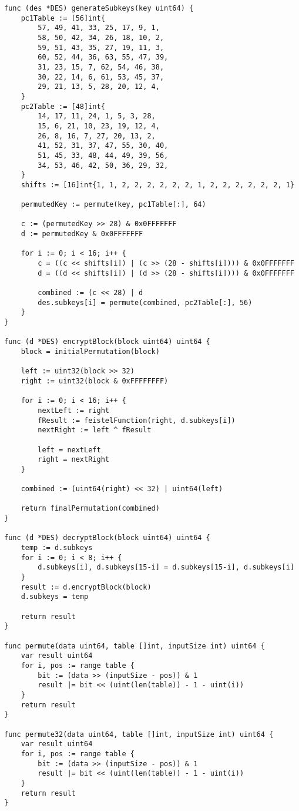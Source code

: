 \begin{lstlisting}[style=golang, caption={Реализация алгоритма шифрования и расшифровки с открытым ключом файла}, label=lst:codegolang]
func (des *DES) generateSubkeys(key uint64) {
	pc1Table := [56]int{
		57, 49, 41, 33, 25, 17, 9, 1,
		58, 50, 42, 34, 26, 18, 10, 2,
		59, 51, 43, 35, 27, 19, 11, 3,
		60, 52, 44, 36, 63, 55, 47, 39,
		31, 23, 15, 7, 62, 54, 46, 38,
		30, 22, 14, 6, 61, 53, 45, 37,
		29, 21, 13, 5, 28, 20, 12, 4,
	}
	pc2Table := [48]int{
		14, 17, 11, 24, 1, 5, 3, 28,
		15, 6, 21, 10, 23, 19, 12, 4,
		26, 8, 16, 7, 27, 20, 13, 2,
		41, 52, 31, 37, 47, 55, 30, 40,
		51, 45, 33, 48, 44, 49, 39, 56,
		34, 53, 46, 42, 50, 36, 29, 32,
	}
	shifts := [16]int{1, 1, 2, 2, 2, 2, 2, 2, 1, 2, 2, 2, 2, 2, 2, 1}
	
	permutedKey := permute(key, pc1Table[:], 64)
	
	c := (permutedKey >> 28) & 0x0FFFFFFF
	d := permutedKey & 0x0FFFFFFF
	
	for i := 0; i < 16; i++ {
		c = ((c << shifts[i]) | (c >> (28 - shifts[i]))) & 0x0FFFFFFF
		d = ((d << shifts[i]) | (d >> (28 - shifts[i]))) & 0x0FFFFFFF
		
		combined := (c << 28) | d
		des.subkeys[i] = permute(combined, pc2Table[:], 56)
	}
}

func (d *DES) encryptBlock(block uint64) uint64 {
	block = initialPermutation(block)
	
	left := uint32(block >> 32)
	right := uint32(block & 0xFFFFFFFF)
	
	for i := 0; i < 16; i++ {
		nextLeft := right
		fResult := feistelFunction(right, d.subkeys[i])
		nextRight := left ^ fResult
		
		left = nextLeft
		right = nextRight
	}
	
	combined := (uint64(right) << 32) | uint64(left)
	
	return finalPermutation(combined)
}

func (d *DES) decryptBlock(block uint64) uint64 {
	temp := d.subkeys
	for i := 0; i < 8; i++ {
		d.subkeys[i], d.subkeys[15-i] = d.subkeys[15-i], d.subkeys[i]
	}
	result := d.encryptBlock(block)
	d.subkeys = temp
	
	return result
}

func permute(data uint64, table []int, inputSize int) uint64 {
	var result uint64
	for i, pos := range table {
		bit := (data >> (inputSize - pos)) & 1
		result |= bit << (uint(len(table)) - 1 - uint(i))
	}
	return result
}

func permute32(data uint64, table []int, inputSize int) uint64 {
	var result uint64
	for i, pos := range table {
		bit := (data >> (inputSize - pos)) & 1
		result |= bit << (uint(len(table)) - 1 - uint(i))
	}
	return result
}


\end{lstlisting}
